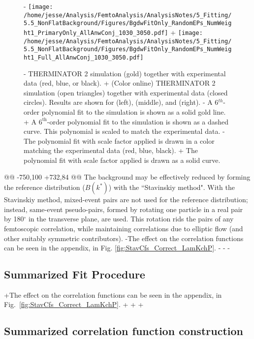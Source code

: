 \begin{table}[htbp]
\begin{table}[htbp]
 \begin{figure}[h]
   \centering
-  \texttt{[image: /home/jesse/Analysis/FemtoAnalysis/AnalysisNotes/5\_Fitting/5.5\_NonFlatBackground/Figures/BgdwFitOnly\_RandomEPs\_NumWeight1\_PrimaryOnly\_AllAnwConj\_1030\_3050.pdf]}
+  \texttt{[image: /home/jesse/Analysis/FemtoAnalysis/AnalysisNotes/5\_Fitting/5.5\_NonFlatBackground/Figures/BgdwFitOnly\_RandomEPs\_NumWeight1\_Full\_AllAnwConj\_1030\_3050.pdf]}
   \caption[Backgrounds with THERMINATOR 2]
   {
-  THERMINATOR 2 simulation (gold) together with experimental data (red, blue, or black).  
+  (Color online) THERMINATOR 2 simulation (open triangles) together with experimental data (closed circles).  
   Results are shown for \LamKchP (left), \LamKchM (middle), and \LamKs (right).
-  A 6$^{th}$-order polynomial fit to the simulation is shown as a solid gold line.  
+  A $6^{\mathrm{th}}$-order polynomial fit to the simulation is shown as a dashed curve.  
   This polynomial is scaled to match the experimental data.  
-  The polynomial fit with scale factor applied is drawn in a color matching the experimental data (red, blue, black).
+  The polynomial fit with scale factor applied is drawn as a solid curve.
   }
   \label{fig:BgdswTHERM}
 \end{figure} 
@@ -750,100 +732,84 @@
 The background may be effectively reduced by forming the reference distribution ($B(k^{*})$) with the ``Stavinskiy method".
 With the Stavinskiy method, mixed-event pairs are not used for the reference distribution; instead, same-event pseudo-pairs, formed by rotating one particle in a real pair by 180$^\circ$ in the transverse plane, are used.  
 This rotation rids the pairs of any femtoscopic correlation, while maintaining correlations due to elliptic flow (and other suitably symmetric contributors).
-The effect on the \LamKchP correlation functions can be seen in the appendix, in Fig. \ref{fig:StavCfs_Correct_LamKchP}.
-
-
-\subsection{Summarized Fit Procedure}
+The effect on the \LamKchP correlation functions can be seen in the appendix, in Fig.\ \ref{fig:StavCfs_Correct_LamKchP}.
+
+
+\subsection{Summarized correlation function construction}
 \label{SummarizedFitProcedure}
 

\end{table}
\end{table}
